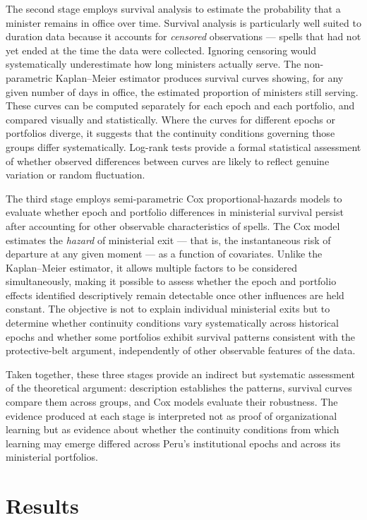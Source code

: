 \documentclass[doc, 12pt, a4paper,floatsintext]{apa7}
\begin{document}
The second stage employs survival analysis to estimate the probability 
that a minister remains in office over time. Survival analysis is 
particularly well suited to duration data because it accounts for 
\textit{censored} observations --- spells that had not yet ended at the 
time the data were collected. Ignoring censoring would systematically 
underestimate how long ministers actually serve. The non-parametric 
Kaplan--Meier estimator produces survival curves showing, for any given 
number of days in office, the estimated proportion of ministers still 
serving. These curves can be computed separately for each epoch and each 
portfolio, and compared visually and statistically. Where the curves for 
different epochs or portfolios diverge, it suggests that the continuity 
conditions governing those groups differ systematically. Log-rank tests 
provide a formal statistical assessment of whether observed differences 
between curves are likely to reflect genuine variation or random 
fluctuation.

The third stage employs semi-parametric Cox proportional-hazards models 
to evaluate whether epoch and portfolio differences in ministerial survival 
persist after accounting for other observable characteristics of spells. 
The Cox model estimates the \textit{hazard} of ministerial exit --- that 
is, the instantaneous risk of departure at any given moment --- as a 
function of covariates. Unlike the Kaplan--Meier estimator, it allows 
multiple factors to be considered simultaneously, making it possible to 
assess whether the epoch and portfolio effects identified descriptively 
remain detectable once other influences are held constant. The objective 
is not to explain individual ministerial exits but to determine whether 
continuity conditions vary systematically across historical epochs and 
whether some portfolios exhibit survival patterns consistent with the 
protective-belt argument, independently of other observable features of 
the data.

Taken together, these three stages provide an indirect but systematic 
assessment of the theoretical argument: description establishes the 
patterns, survival curves compare them across groups, and Cox models 
evaluate their robustness. The evidence produced at each stage is 
interpreted not as proof of organizational learning but as evidence about 
whether the continuity conditions from which learning may emerge differed 
across Peru's institutional epochs and across its ministerial portfolios.

\section{Results}
\end{document}
